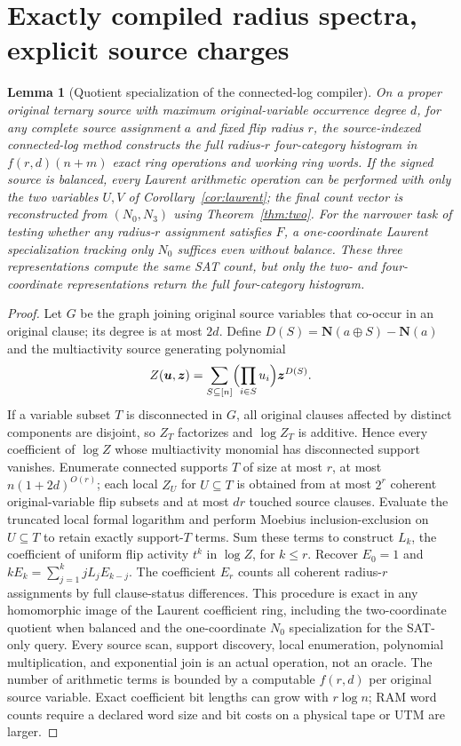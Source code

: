 \documentclass[11pt]{article}
\newtheorem{lemma}{Lemma}
\newcommand{\vN}{\boldsymbol N}
\begin{document}
\section{Exactly compiled radius spectra, explicit source charges}
\begin{lemma}[Quotient specialization of the connected-log compiler]\label{lem:log}
On a proper original ternary source with maximum original-variable occurrence degree $d$, for any complete source assignment $a$ and fixed flip radius $r$, the source-indexed connected-log method constructs the full radius-$r$ four-category histogram in $f(r,d)(n+m)$ exact ring operations and working ring words. If the signed source is balanced, every Laurent arithmetic operation can be performed with only the two variables $U,V$ of Corollary~\ref{cor:laurent}; the final count vector is reconstructed from $(N_0,N_3)$ using Theorem~\ref{thm:two}. For the narrower task of testing whether any radius-$r$ assignment satisfies $F$, a \emph{one-coordinate} Laurent specialization tracking only $N_0$ suffices even without balance. These three representations compute the same SAT count, but only the two- and four-coordinate representations return the full four-category histogram.
\end{lemma}
\begin{proof}
Let $G$ be the graph joining original source variables that co-occur in an original clause; its degree is at most $2d$. Define $D(S)=\vN(a\oplus S)-\vN(a)$ and the multiactivity source generating polynomial
\[Z(\boldsymbol u,\boldsymbol z)=\sum_{S\subseteq[n]}\Bigl(\prod_{i\in S}u_i\Bigr)\boldsymbol z^{D(S)}.\]
If a variable subset $T$ is disconnected in $G$, all original clauses affected by distinct components are disjoint, so $Z_T$ factorizes and $\log Z_T$ is additive. Hence every coefficient of $\log Z$ whose multiactivity monomial has disconnected support vanishes. Enumerate connected supports $T$ of size at most $r$, at most $n(1+2d)^{O(r)}$; each local $Z_U$ for $U\subseteq T$ is obtained from at most $2^r$ coherent original-variable flip subsets and at most $dr$ touched source clauses. Evaluate the truncated local formal logarithm and perform Moebius inclusion-exclusion on $U\subseteq T$ to retain exactly support-$T$ terms. Sum these terms to construct $L_k$, the coefficient of uniform flip activity $t^k$ in $\log Z$, for $k\le r$. Recover $E_0=1$ and $kE_k=\sum_{j=1}^k jL_jE_{k-j}$. The coefficient $E_r$ counts all coherent radius-$r$ assignments by full clause-status differences. This procedure is exact in any homomorphic image of the Laurent coefficient ring, including the two-coordinate quotient when balanced and the one-coordinate $N_0$ specialization for the SAT-only query. Every source scan, support discovery, local enumeration, polynomial multiplication, and exponential join is an actual operation, not an oracle. The number of arithmetic terms is bounded by a computable $f(r,d)$ per original source variable. Exact coefficient bit lengths can grow with $r\log n$; RAM word counts require a declared word size and bit costs on a physical tape or UTM are larger.\end{proof}
\end{document}
